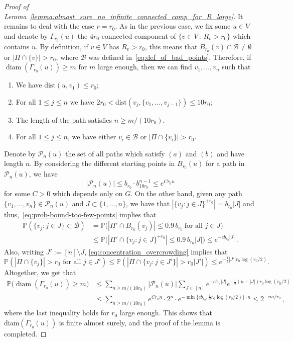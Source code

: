 \documentclass[11pt, reqno]{article}
\numberwithin{equation}{section}
\theoremstyle{definition}
\def\cP{\mathcal{P}}
\def\cB{\mathcal{B}}
\def\P{\mathbb{P}}
\newcommand{\1}{\mathds{1}}
\DeclareMathOperator{\diam}{diam}
\begin{document}
\begin{proof}[Proof of Lemma~\ref{lemma:almost_sure_no_infinite_connected_comp_for_R_large}]
    It remains to deal with the case $r=r_0$. As in the previous case, we fix some $u\in V$ and denote by $\Gamma_{r_0}(u)$ the $4r_0$-connected component of $\{v\in V \, : \, R_{v}>r_0 \}$ which contains $u$.
    By definition, if $v\in V$ has $R_{v}>r_0$, this means that $B_{r_0}(v) \cap \cB \not=\emptyset$ or $|\Pi \cap \{v\}|>r_0$, where $\cB$ was defined in~\eqref{eq:def_of_bad_points}. Therefore, if $\diam(\Gamma_{r_0}(u)) \ge m$ for $m$ large enough, then we can find $v_1,\ldots,v_n$ such that 
    \begin{enumerate}
        \item[(a)] We have $\text{dist}(u,v_1) \le r_0$;
        \item[(b)] For all $1\le j\le n$ we have $2r_0 < \text{dist}(v_j,\{v_1,\dots,v_{j-1}\}) \le 10r_0$;
        \item[(c)] The length of the path satisfies $n\ge m/(10r_0)$.
        \item[(d)] For all $1\le j\le n$, we have either $v_i \in \cB$ or $|\Pi \cap \{v_i\}|>r_0$.
    \end{enumerate}
    Denote by $\cP_{n}(u)$ the set of all paths which satisfy $(a)$ and $(b)$ and have length $n$.
    By considering the different starting points in $B_{r_0}(u)$ for a path in $\cP_n(u)$, we have 
    \[
    |\cP_n(u)| \le b_{r_0} \cdot b_{10r_0}^{n-1} \le e^{Cr_0 n}
    \]
    for some $C>0$ which depends only on $G$.
    On the other hand, given any path $\{v_1,\ldots,v_n\}\in \cP_n(u)$ and $J \subset \{1,\dots,n\}$, we have that $|\{ v_j : j \in J\}^{+r_0}|=b_{r_0}|J|$
    and thus,~\eqref{eq:prob-bound-too-few-points} implies that 
    \begin{align*}
     \P(\{v_j:j\in J\} \subset \cB)
      &=\P\big(|\Pi'\cap B_{r_0}(v_j)| \le 0.9\, b_{r_0} \ \text{for all } j \in J\big) \\
      &\le \P\big(|\Pi'\cap \{v_j : j \in J\}^{+r_0}| \le 0.9\, b_{r_0}|J| \big) \le e^{-c b_{r_0} |J|} \, .
    \end{align*}
    Also, writing $J':=[n] \setminus J$, \eqref{eq:concentration_overcrowding} implies that
    \[ \P(|\Pi \cap \{v_j\}|>r_0\text{ for all }j \in J') \le \P(|\Pi \cap \{v_j : j \in J'\}|>r_0|J'|) \le e^{-\frac12|J'|r_0\log (r_0/2)}. \]
    Altogether, we get that
    \begin{align*}
        \P\big(\diam(\Gamma_{r_0}(u))\ge m\big)
         &\le \sum_{n\ge m/(10r_0)} |\cP_{n}(u)| \sum_{J \subset [n]} e^{-c b_{r_0} |J|} e^{-\frac12(n-|J|)r_0\log(r_0/2)} \\ 
         &\le \sum_{n\ge m/(10r_0)} e^{Cr_0 n} \cdot 2^n \cdot e^{-\min\{c b_{r_0},\frac12 r_0\log (r_0/2)\} \cdot n} \le 2^{-cm/r_0} \, ,
    \end{align*}
    where the last inequality holds for $r_0$ large enough. This shows that $\text{diam}(\Gamma_{r_0}(u))$ is finite almost surely, and the proof of the lemma is completed.
\end{proof}
\end{document}
